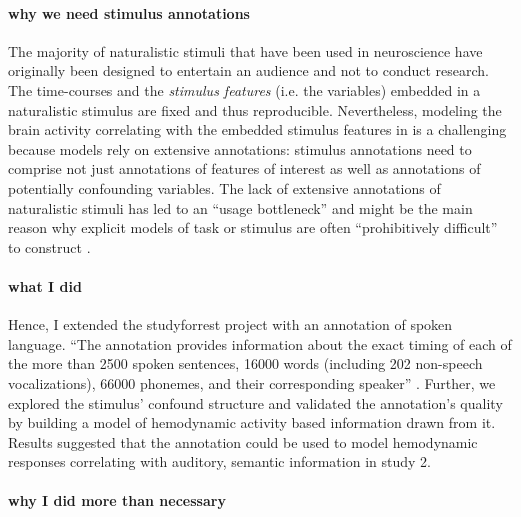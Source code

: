 

\paragraph{why we need stimulus annotations}


%
The majority of naturalistic stimuli that have been used in neuroscience have
originally been designed to entertain an audience and not to conduct research.
%
The time-courses and the \textit{stimulus features} (i.e. the variables)
embedded in a naturalistic stimulus are fixed and thus reproducible.
%
Nevertheless, modeling the brain activity correlating with the embedded stimulus
features in is a challenging \citep{saarimaki2021naturalistic,
simony2020analysis} because models rely on extensive annotations:
%
stimulus annotations need to comprise not just annotations of features of
interest as well as annotations of potentially confounding variables.
%
The lack of extensive annotations of naturalistic stimuli has led to an ``usage
bottleneck'' \citep{aliko2020naturalistic} and might be the main reason why
explicit models of task or stimulus are often ``prohibitively difficult'' to
construct \citep{nastase2019measuring}.


\paragraph{what I did}

Hence, I extended the studyforrest project with an annotation of spoken
language.
``The annotation provides information about the exact timing of each of the more
than 2500 spoken sentences, 16000 words (including 202 non-speech
vocalizations), 66000 phonemes, and their corresponding speaker''
\citep{haeusler2021speechanno}.
%
Further, we explored the stimulus' confound structure and validated the
annotation's quality by building a model of hemodynamic activity based
information drawn from it.
%
Results suggested that the annotation could be used to model hemodynamic
responses correlating with auditory, semantic information in study 2.


\paragraph{why I did more than necessary}


